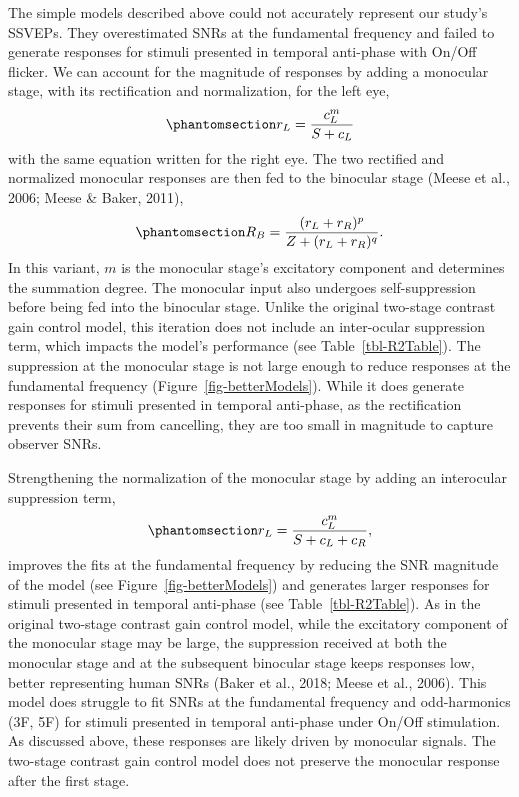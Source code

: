 \documentclass[
  12pt,
]{article}
\begin{document}
The simple models described above could not accurately represent our
study's SSVEPs. They overestimated SNRs at the fundamental frequency and
failed to generate responses for stimuli presented in temporal
anti-phase with On/Off flicker. We can account for the magnitude of
responses by adding a monocular stage, with its rectification and
normalization, for the left eye,
\begin{equation}\phantomsection\label{eq-firstStageofTwoNoInter}{
r_L = \frac{c_L^m}{S + c_L}
}\end{equation} with the same equation written for the right eye. The
two rectified and normalized monocular responses are then fed to the
binocular stage (Meese et al., 2006; Meese \& Baker, 2011),
\begin{equation}\phantomsection\label{eq-binocComb}{
R_{B} = \frac{(r_L+r_R)^p}{Z+(r_L+r_R)^q}.
}\end{equation} In this variant, \(m\) is the monocular stage's
excitatory component and determines the summation degree. The monocular
input also undergoes self-suppression before being fed into the
binocular stage. Unlike the original two-stage contrast gain control
model, this iteration does not include an inter-ocular suppression term,
which impacts the model's performance (see Table~\ref{tbl-R2Table}). The
suppression at the monocular stage is not large enough to reduce
responses at the fundamental frequency (Figure~\ref{fig-betterModels}).
While it does generate responses for stimuli presented in temporal
anti-phase, as the rectification prevents their sum from cancelling,
they are too small in magnitude to capture observer SNRs.

Strengthening the normalization of the monocular stage by adding an
interocular suppression term,
\begin{equation}\phantomsection\label{eq-firstStageofTwo}{
r_{L} = \frac{c_L^m}{S + c_L + c_R},
}\end{equation} improves the fits at the fundamental frequency by
reducing the SNR magnitude of the model (see
Figure~\ref{fig-betterModels}) and generates larger responses for
stimuli presented in temporal anti-phase (see Table~\ref{tbl-R2Table}).
As in the original two-stage contrast gain control model, while the
excitatory component of the monocular stage may be large, the
suppression received at both the monocular stage and at the subsequent
binocular stage keeps responses low, better representing human SNRs
(Baker et al., 2018; Meese et al., 2006). This model does struggle to
fit SNRs at the fundamental frequency and odd-harmonics (3F, 5F) for
stimuli presented in temporal anti-phase under On/Off stimulation. As
discussed above, these responses are likely driven by monocular signals.
The two-stage contrast gain control model does not preserve the
monocular response after the first stage.
\end{document}
